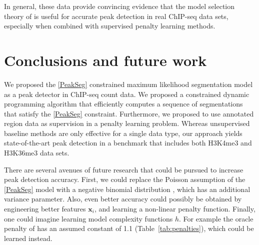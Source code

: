 \documentclass{article}
\begin{document}
In general, these data provide convincing evidence that the model
selection theory of \citet{cleynen2013segmentation} is useful for
accurate peak detection in real ChIP-seq data sets, especially when
combined with supervised penalty learning methods.



\section{Conclusions and future work}
\label{sec:conclusions}

We proposed the \ref{PeakSeg} constrained maximum likelihood
segmentation model as a peak detector in ChIP-seq count data. We
proposed a constrained dynamic programming algorithm that efficiently
computes a sequence of segmentations that satisfy the \ref{PeakSeg}
constraint. Furthermore, we proposed to use annotated region data as
supervision in a penalty learning problem. Whereas unsupervised
baseline methods are only effective for a single data type, our
approach yields state-of-the-art peak detection in a benchmark that
includes both H3K4me3 and H3K36me3 data sets.

There are several avenues of future research that could be pursued to
increase peak detection accuracy. First, we could replace the Poisson
assumption of the \ref{PeakSeg} model with a negative binomial
distribution \citep{cleynen2013segmentation}, which has an additional
variance parameter. Also, even better accuracy could possibly be
obtained by engineering better features $\mathbf x_i$, and learning a
non-linear penalty function. Finally, one could imagine learning model
complexity functions $h$. For example the oracle penalty of
\citet{cleynen2013segmentation} has an assumed constant of 1.1
(Table~\ref{tab:penalties}), which could be learned instead.
\end{document}
